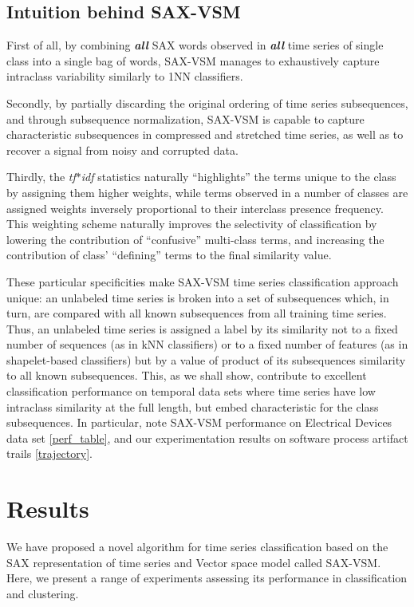 \documentclass{llncs}
\begin{document}
\subsection{Intuition behind SAX-VSM}
First of all, by combining \textit{\textbf{all}} SAX words observed in \textit{\textbf{all}}
time series of single class into a single bag of words, SAX-VSM manages to exhaustively 
capture intraclass variability similarly to 1NN classifiers.  

Secondly, by partially discarding the original ordering of time series subsequences, and
through subsequence normalization, SAX-VSM is capable to capture characteristic 
subsequences in compressed and stretched time series, as well as to recover a signal 
from noisy and corrupted data. 

Thirdly, the \textit{tf$\ast$idf} statistics naturally ``highlights'' the terms unique to the
class by assigning them higher weights, while terms observed in a number of classes are 
assigned weights inversely proportional to their interclass presence frequency. 
This weighting scheme naturally improves the selectivity of classification 
by  lowering the contribution of ``confusive'' multi-class terms, and  increasing  the 
contribution  of  class' ``defining'' terms to the final similarity value.   

These particular specificities make SAX-VSM time series classification approach unique:
an unlabeled time series is broken into a set of subsequences which, in turn, are 
compared with all known subsequences from all training time series. Thus, an unlabeled 
time series is assigned a label by its similarity not to a fixed number of sequences 
(as in kNN classifiers) or to a fixed number of features (as in shapelet-based classifiers)
but by a value of product of its subsequences similarity to all known subsequences.
This, as we shall show, contribute to excellent classification performance on temporal data 
sets where time series have low intraclass similarity at the full length, but embed 
characteristic for the class subsequences. In particular, note SAX-VSM performance 
on Electrical Devices data set \ref{perf_table}, and our experimentation results on 
software process artifact trails \ref{trajectory}.
   
\section{Results}
We have proposed a novel algorithm for time series classification based on the SAX
representation of time series and Vector space model called SAX-VSM. Here, we present a range of
experiments assessing its performance in classification and clustering.
\end{document}
